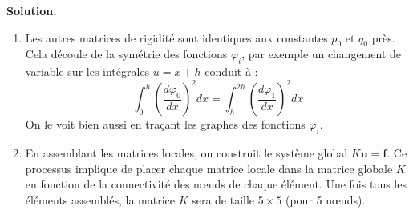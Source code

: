 \documentclass[11pt,a4paper]{report}
\newenvironment{solution}
{
    \vspace{0.5em}
    \begin{mdframed}[backgroundcolor=ThemeLight,leftmargin=0,rightmargin=0,skipabove=0.2em,skipbelow=0.2em]
    \textbf{Solution.}\\[0.5em]
}
{
    \end{mdframed}
    \vspace{0.5em}
}
\begin{document}
\begin{enumerate}[itemsep=0.5em]
{\begin{solution}
\begin{enumerate}
            Finalement :
            \[
            K_{11} = \frac{p_0}{h} + q_0 \frac{h}{3}
            \]
            
            Pour le second terme, on a :

            \[
            K_{12} = K_{21} = \int_{0}^{h} p_0 \left( -\frac{1}{h} \right) \left( \frac{1}{h} \right) dx + q_0 \int_{0}^{h} \Big(1 - \frac{x}{h}\Big) \Big(\frac{x}{h}\Big) dx
            \]
            Ainsi, 
            \[
            K_{12} = K_{21} = -\frac{p_0}{h} + q_0 \int_{0}^{h} \frac{x}{h} \Big(1 - \frac{x}{h}\Big)  dx
            \]
            Or 
            \[\int_{0}^{h} \frac{x}{h}\Big(1 - \frac{x}{h}\Big)  dx = \frac{1}{h}\Big[\frac{x^2}{2} - \frac{x^3}{3h}\Big]_{0}^{h} = \frac{h}{6}.\]

            Finalement :
            \[
            K_{12} = K_{21} = -\frac{p_0}{h} + q_0 \frac{h}{6}
            \]
            
            Pour le dernier coefficient de la matrice, on a :
            \[
            K_{22} = \int_{0}^{h} p_0 \left( \frac{1}{h} \right)^2 dx  + q_0 \int_{0}^{h} \Big(\frac{x}{h}\Big)^2 dx = \frac{p_0}{h} + q_0 \frac{h}{3}.
            \]
            
            En rassemblant les résultats, la matrice de rigidité sur le premier élément est:
            \[
            K = \frac{p_0}{h}
            \begin{pmatrix}
                1 & -1 \\
                -1 & 1
            \end{pmatrix}
            + q_0 \frac{h}{3}
            \begin{pmatrix}
                1 & 1/2 \\
                1/2 & 1
            \end{pmatrix}
            \]

            \item Les autres matrices de rigidité sont identiques aux constantes $p_0$ et $q_0$ près. Cela découle de la symétrie des fonctions $\varphi_i$, par exemple un changement de variable sur les intégrales $u=x+h$ conduit à :
            \[
            \int_0^h \left( \frac{d\varphi_0}{dx} \right)^2 dx = \int_h^{2h} \left( \frac{d\varphi_1}{dx} \right)^2 dx 
            \]
            On le voit bien aussi en traçant les graphes des fonctions $\varphi_i$.
            \item En assemblant les matrices locales, on construit le système global $K \mathbf{u} = \mathbf{f}$. Ce processus implique de placer chaque matrice locale dans la matrice globale $K$ en fonction de la connectivité des nœuds de chaque élément. 
            Une fois tous les éléments assemblés, la matrice $K$ sera de taille $5 \times 5$ (pour 5 nœuds).


\end{enumerate}
\end{solution}}
\end{enumerate}
\end{document}
